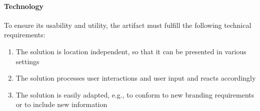 \paragraph{Technology} To ensure its usability and utility, the artifact must fulfill the following technical requirements:
\begin{enumerate}[nosep]
\setcounter{enumi}{\value{foo}}
    \item The solution is location independent, so that it can be presented in various settings
    \item The solution processes user interactions and user input and reacts accordingly
    \item The solution is easily adapted, e.g., to conform to new branding requirements or to include new information
\end{enumerate}



